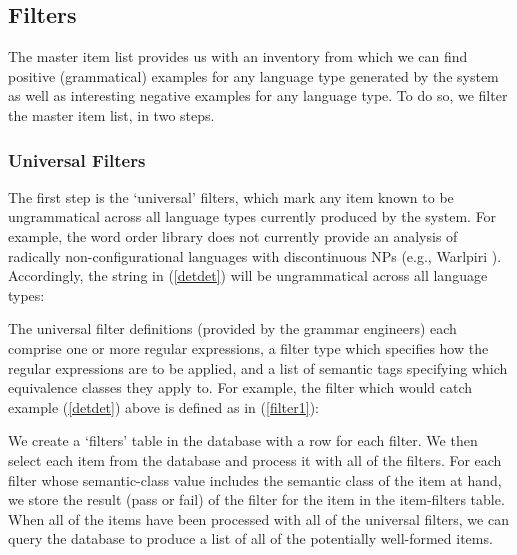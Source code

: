 \documentclass[11pt]{article}
\begin{document}
\subsection{Filters}

The master item list provides us with an inventory from which we
can find positive (grammatical) examples for any language type
generated by the system as well as interesting negative examples for
any language type.  To do so, we filter the master item list, in two
steps.  


\subsubsection{Universal Filters}

The first step is the `universal' filters, which mark any
item known to be ungrammatical across all language types currently
produced by the system.  For example, the word order library does
not currently provide an analysis of radically non-configurational
languages with discontinuous NPs (e.g., Warlpiri \cite{Hale81}).
Accordingly, the string in (\ref{detdet}) will be ungrammatical
across all language types:


The universal filter definitions (provided by the grammar engineers)
each comprise one or more regular expressions, a filter type which
specifies how the regular expressions are to be applied, and a list of
semantic tags specifying which equivalence classes they apply to.  For
example, the filter which would catch example (\ref{detdet}) above
is defined as in (\ref{filter1}):

%
We create a `filters' table in the database with a row for each
filter.  We then select each item from the database and process it
with all of the filters.  For each filter whose semantic-class value
includes the semantic class of the item at hand, we store the result
(pass or fail) of the filter for the item in the item-filters table.
When all of the items have been processed with all of the universal
filters, we can query the database to produce a list of all of the
potentially well-formed items.
\end{document}
